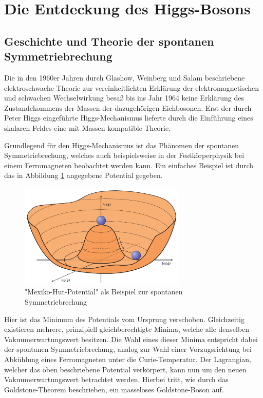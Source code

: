 
\section{Die Entdeckung des Higgs-Bosons}


\subsection{Geschichte und Theorie der spontanen Symmetriebrechung}
Die in den 1960er Jahren durch Glashow, Weinberg und Salam beschriebene elektroschwache Theorie zur vereinheitlichten Erklärung der elektromagnetischen und schwachen Wechselwirkung besaß bis ins Jahr 1964 keine Erklärung des Zustandekommens der Massen der dazugehörigen Eichbosonen.
Erst der durch Peter Higgs eingeführte Higgs-Mechanismus lieferte durch die Einführung eines skalaren Feldes eine mit Massen kompatible Theorie.

Grundlegend für den Higgs-Mechanismus ist das Phänomen der spontanen Symmetriebrechung, welches auch beispielsweise in der Festkörperphysik bei einem Ferromagneten beobachtet werden kann.
Ein einfaches Beispiel ist durch das in Abbildung \ref{fig:higgs} angegebene Potential gegeben.

\begin{figure}
  \centering
  \includegraphics[height=5.0cm]{ressources/higgspotential.png}
  \caption{"Mexiko-Hut-Potential" als Beispiel zur spontanen Symmetriebrechung \cite{Ellis:2012465}}
  \label{fig:higgs}
\end{figure}

Hier ist das Minimum des Potentials vom Ursprung verschoben.
Gleichzeitig existieren mehrere, prinzipiell gleichberechtigte Minima, welche alle denselben Vakuumerwartungswert besitzen.
Die Wahl eines dieser Minima entspricht dabei der spontanen Symmetriebrechung, analog zur Wahl einer Vorzugsrichtung bei Abkühlung eines Ferromagneten unter die Curie-Temperatur.
Der Lagrangian, welcher das oben beschriebene Potential verkörpert, kann nun um den neuen Vakuumerwartungswert betrachtet werden.
Hierbei tritt, wie durch das Goldstone-Theorem beschrieben, ein masseloses Goldstone-Boson auf.

